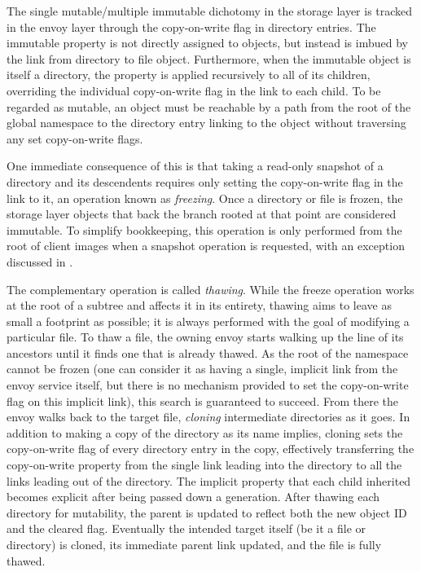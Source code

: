 The single mutable/multiple immutable dichotomy in the storage layer is tracked in the envoy layer through the copy-on-write flag in directory entries. The immutable property is not directly assigned to objects, but instead is imbued by the link from directory to file object. Furthermore, when the immutable object is itself a directory, the property is applied recursively to all of its children, overriding the individual copy-on-write flag in the link to each child. To be regarded as mutable, an object must be reachable by a path from the root of the global namespace to the directory entry linking to the object without traversing any set copy-on-write flags.

One immediate consequence of this is that taking a read-only snapshot of a directory and its descendents requires only setting the copy-on-write flag in the link to it, an operation known as \emph{freezing}. Once a directory or file is frozen, the storage layer objects that back the branch rooted at that point are considered immutable. To simplify bookkeeping, this operation is only performed from the root of client images when a snapshot operation is requested, with an exception discussed in .

The complementary operation is called \emph{thawing}. While the freeze operation works at the root of a subtree and affects it in its entirety, thawing aims to leave as small a footprint as possible; it is always performed with the goal of modifying a particular file. To thaw a file, the owning envoy starts walking up the line of its ancestors until it finds one that is already thawed. As the root of the namespace cannot be frozen (one can consider it as having a single, implicit link from the envoy service itself, but there is no mechanism provided to set the copy-on-write flag on this implicit link), this search is guaranteed to succeed. From there the envoy walks back to the target file, \emph{cloning} intermediate directories as it goes. In addition to making a copy of the directory as its name implies, cloning sets the copy-on-write flag of every directory entry in the copy, effectively transferring the copy-on-write property from the single link leading into the directory to all the links leading out of the directory. The implicit property that each child inherited becomes explicit after being passed down a generation. After thawing each directory for mutability, the parent is updated to reflect both the new object ID and the cleared flag. Eventually the intended target itself (be it a file or directory) is cloned, its immediate parent link updated, and the file is fully thawed.

